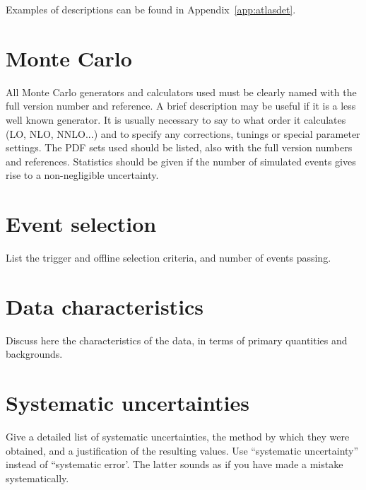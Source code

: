 \documentclass[PAPER,UKenglish,texlive=2016]{\ATLASLATEXPATH atlasdoc}
\begin{document}
Examples of descriptions can be found in Appendix~\ref{app:atlasdet}.


\section{Monte Carlo}
\label{sec:MC}

All Monte Carlo generators and calculators used must be clearly named with the full version number and reference.
A brief description may be useful if it is a less well known generator.
It is usually necessary to say to what order it calculates (LO, NLO, NNLO...) 
and to specify any corrections, tunings or special parameter settings.
The PDF sets used should be listed, also with the full version numbers and references.
Statistics should be given if the number of simulated events gives rise to a non-negligible uncertainty.


\section{Event selection}
\label{sec:selection}

List the trigger and offline selection criteria, and number of events passing.


\section{Data characteristics}
\label{sec:control}

Discuss here the characteristics of the data, in terms of primary quantities and backgrounds.


\section{Systematic uncertainties}
\label{sec:syst}

Give a detailed list of systematic uncertainties, the method by which they were obtained,
and a justification of the resulting values.
Use ``systematic uncertainty'' instead of ``systematic error'.
The latter sounds as if you have made a mistake systematically.
\end{document}
